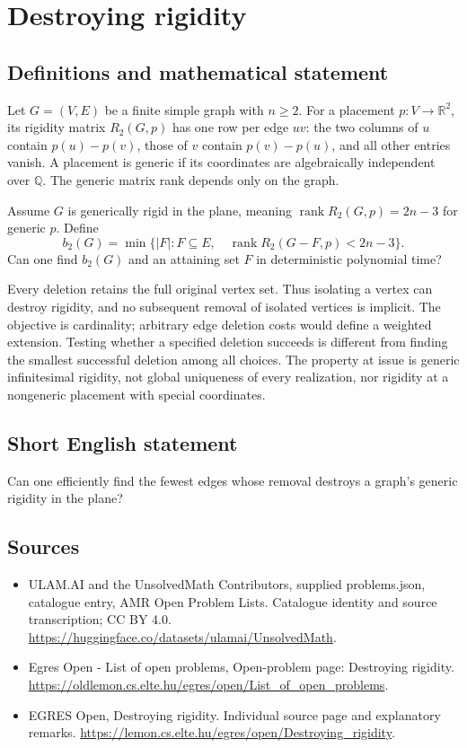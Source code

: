\documentclass[11pt,a4paper]{article}
\begin{document}
\section*{Destroying rigidity}\label{statement}

\subsection{Definitions and mathematical statement}
Let $G=(V,E)$ be a finite simple graph with $n\ge2$. For a placement
$p:V\to\mathbb R^2$, its rigidity matrix $R_2(G,p)$ has one row per
edge $uv$: the two columns of $u$ contain $p(u)-p(v)$, those of $v$
contain $p(v)-p(u)$, and all other entries vanish. A placement is generic
if its coordinates are algebraically independent over $\mathbb Q$.
The generic matrix rank depends only on the graph.

Assume $G$ is generically rigid in the plane, meaning
$\operatorname{rank}R_2(G,p)=2n-3$ for generic $p$. Define
\[
 b_2(G)=\min\{|F|:F\subseteq E,\quad
        \operatorname{rank}R_2(G-F,p)<2n-3\}.
\]
Can one find $b_2(G)$ and an attaining set $F$ in deterministic
polynomial time?

Every deletion retains the full original vertex set. Thus isolating
a vertex can destroy rigidity, and no subsequent removal of isolated
vertices is implicit. The objective is cardinality; arbitrary edge
deletion costs would define a weighted extension. Testing whether a
specified deletion succeeds is different from finding the smallest
successful deletion among all choices. The property at issue is generic
infinitesimal rigidity, not global uniqueness of every realization,
nor rigidity at a nongeneric placement with special coordinates.
\subsection{Short English statement}
Can one efficiently find the fewest edges whose removal destroys
a graph's generic rigidity in the plane?
\subsection{Sources}
\begin{itemize}
\item[S1] ULAM.AI and the UnsolvedMath Contributors, supplied problems.json, catalogue entry, AMR Open Problem Lists. Catalogue identity and source transcription; CC BY 4.0.
\url{https://huggingface.co/datasets/ulamai/UnsolvedMath}.
\item[S2] Egres Open - List of open problems, Open-problem page: Destroying rigidity. 
\url{https://oldlemon.cs.elte.hu/egres/open/List_of_open_problems}.
\item[S3] EGRES Open, Destroying rigidity. Individual source page and explanatory remarks.
\url{https://lemon.cs.elte.hu/egres/open/Destroying_rigidity}.
\end{itemize}
\end{document}
